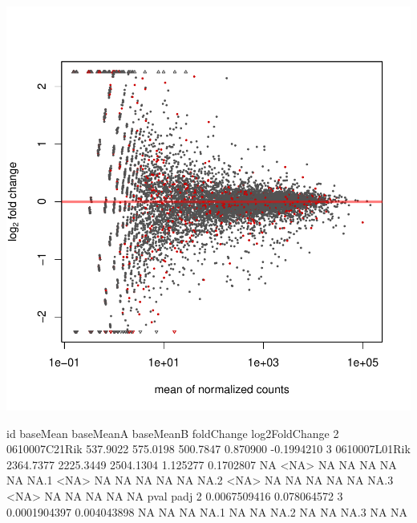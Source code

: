 \documentclass{article}
\begin{document}
\includegraphics{JuanHenao_Taller3A-006}
\begin{Schunk}
\begin{Soutput}
                id  baseMean baseMeanA baseMeanB foldChange log2FoldChange
2    0610007C21Rik  537.9022  575.0198  500.7847   0.870900     -0.1994210
3    0610007L01Rik 2364.7377 2225.3449 2504.1304   1.125277      0.1702807
NA            <NA>        NA        NA        NA         NA             NA
NA.1          <NA>        NA        NA        NA         NA             NA
NA.2          <NA>        NA        NA        NA         NA             NA
NA.3          <NA>        NA        NA        NA         NA             NA
             pval        padj
2    0.0067509416 0.078064572
3    0.0001904397 0.004043898
NA             NA          NA
NA.1           NA          NA
NA.2           NA          NA
NA.3           NA          NA
\end{Soutput}
\end{Schunk}
\end{document}
